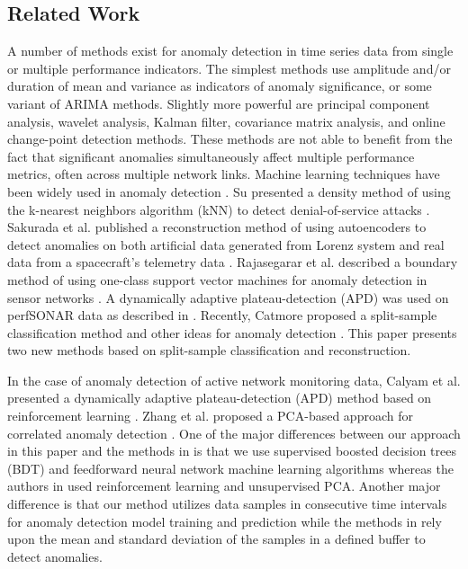 \documentclass[5p]{elsarticle}
\begin{document}
\subsection{Related Work}

A number of methods exist for anomaly detection in time series data from single or multiple performance indicators. The simplest methods use amplitude and/or duration of mean and variance as indicators of anomaly significance, or some variant of ARIMA methods. Slightly more powerful are principal component analysis, wavelet analysis, Kalman filter, covariance matrix analysis, and online change-point detection methods. These methods are not able to benefit from the fact that significant anomalies simultaneously affect multiple performance metrics, often across multiple network links. Machine learning techniques have been widely used in anomaly detection \cite{two}. Su presented a density method of using the k-nearest neighbors algorithm (kNN) to detect denial-of-service attacks \cite{three}. Sakurada et al. published a reconstruction method of using autoencoders to detect anomalies on both artificial data generated from Lorenz system and real data from a spacecraft’s telemetry data \cite{four}. Rajasegarar et al. described a boundary method of using one-class support vector machines for anomaly detection in sensor networks \cite{five}. A dynamically adaptive plateau-detection (APD) was used on perfSONAR data as described in \cite{seven}. Recently, Catmore proposed a split-sample classification method and other ideas for anomaly detection \cite{six}. This paper presents two new methods based on split-sample classification and reconstruction. 

In the case of anomaly detection of active network monitoring data, Calyam et al. presented a dynamically adaptive plateau-detection (APD) method based on reinforcement learning \cite{seven} \cite{eight}. Zhang et al. proposed a PCA-based approach for correlated anomaly detection \cite{nine}. One of the major differences between our approach in this paper and the methods in \cite{seven} \cite{eight} \cite{nine} is that we use supervised boosted decision trees (BDT) and feedforward neural network machine learning algorithms whereas the authors in \cite{seven} \cite{eight} \cite{nine} used reinforcement learning and unsupervised PCA. Another major difference is that our method utilizes data samples in consecutive time intervals for anomaly detection model training and prediction while the methods in \cite{seven} \cite{eight} rely upon the mean and standard deviation of the samples in a defined buffer to detect anomalies.
\end{document}
